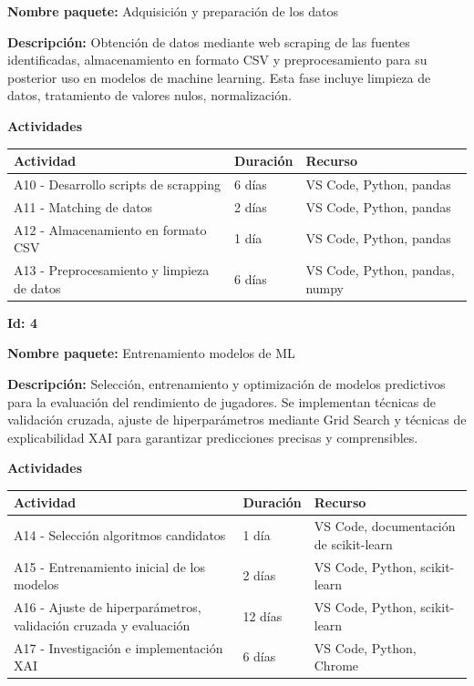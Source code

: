 \textbf{Nombre paquete:} Adquisición y preparación de los datos

\textbf{Descripción:} Obtención de datos mediante web scraping de las fuentes identificadas, almacenamiento en formato CSV y preprocesamiento para su posterior uso en modelos de machine learning. Esta fase incluye limpieza de datos, tratamiento de valores nulos, normalización.

\textbf{Actividades}

\begin{center}
\small
\begin{tabular}{|p{}|p{}|p{}|}
\hline
\textbf{Actividad} & \textbf{Duración} & \textbf{Recurso} \\
\hline
A10 - Desarrollo scripts de scrapping & 6 días & VS Code, Python, pandas \\
\hline
A11 - Matching de datos & 2 días & VS Code, Python, pandas \\
\hline
A12 - Almacenamiento en formato CSV & 1 día & VS Code, Python, pandas \\
\hline
A13 - Preprocesamiento y limpieza de datos & 6 días & VS Code, Python, pandas, numpy \\
\hline
\end{tabular}
\end{center}

\vspace{0.5cm}

\textbf{Id: 4}

\textbf{Nombre paquete:} Entrenamiento modelos de ML

\textbf{Descripción:} Selección, entrenamiento y optimización de modelos predictivos para la evaluación del rendimiento de jugadores. Se implementan técnicas de validación cruzada, ajuste de hiperparámetros mediante Grid Search y técnicas de explicabilidad XAI para garantizar predicciones precisas y comprensibles.

\textbf{Actividades}

\begin{center}
\small
\begin{tabular}{|p{}|p{}|p{}|}
\hline
\textbf{Actividad} & \textbf{Duración} & \textbf{Recurso} \\
\hline
A14 - Selección algoritmos candidatos & 1 día & VS Code, documentación de scikit-learn \\
\hline
A15 - Entrenamiento inicial de los modelos & 2 días & VS Code, Python, scikit-learn \\
\hline
A16 - Ajuste de hiperparámetros, validación cruzada y evaluación & 12 días & VS Code, Python, scikit-learn \\
\hline
A17 - Investigación e implementación XAI & 6 días & VS Code, Python, Chrome \\
\hline
\end{tabular}
\end{center}

